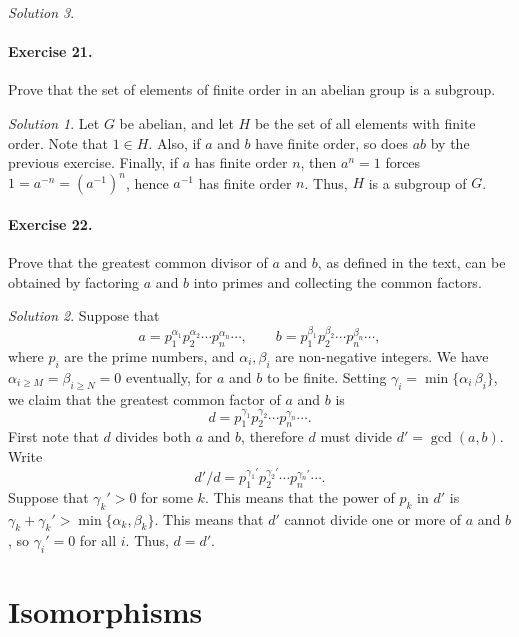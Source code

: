 \documentclass[11pt]{report}
\theoremstyle{remark}
\newtheorem*{solution}{Solution}
\begin{document}
\begin{solution}
    \paragraph{Exercise 21.} Prove that the set of elements of finite order in an
    abelian group is a subgroup.
    \begin{solution}
        Let $G$ be abelian, and let $H$ be the set of all elements with finite
        order. Note that $1 \in H$. Also, if $a$ and $b$ have finite order, so does
        $ab$ by the previous exercise. Finally, if $a$ has finite order $n$, then
        $a^n = 1$ forces $1 = a^{-n} = (a^{-1})^n$, hence $a^{-1}$ has finite order
        $n$. Thus, $H$ is a subgroup of $G$.
    \end{solution}

    \paragraph{Exercise 22.} Prove that the greatest common divisor of $a$ and $b$,
    as defined in the text, can be obtained by factoring $a$ and $b$ into primes and
    collecting the common factors.
    \begin{solution}
        Suppose that \[
            a = p_1^{\alpha_1}p_2^{\alpha_2} \cdots p_n^{\alpha_n} \cdots, \qquad
            b = p_1^{\beta_1}p_2^{\beta_2} \cdots p_n^{\beta_n} \cdots,
        \] where $p_i$ are the prime numbers, and $\alpha_i, \beta_i$ are
        non-negative integers.  We have $\alpha_{i \geq M} = \beta_{i \geq N} = 0$
        eventually, for $a$ and $b$ to be finite. Setting $\gamma_i =
        \min\{\alpha_i\, \beta_i\}$, we claim that the greatest common factor of $a$
        and $b$ is \[
            d = p_1^{\gamma_1}p_2^{\gamma_2} \cdots p_n^{\gamma_n} \cdots.
        \] First note that $d$ divides both $a$ and $b$, therefore $d$ must divide
        $d' = \gcd(a, b)$. Write \[
            d' / d = p_1^{\gamma_1'}p_2^{\gamma_2'}\cdots p_n^{\gamma_n'}\cdots.
        \] Suppose that $\gamma_k' > 0$ for some $k$. This means that the power of
        $p_k$ in $d'$ is $\gamma_k + \gamma_k' > \min\{\alpha_k, \beta_k\}$. This
        means that $d'$ cannot divide one or more of $a$ and $b$, so $\gamma_i' = 0$
        for all $i$. Thus, $d = d'$.
    \end{solution}

    

    \section{Isomorphisms}


\end{solution}
\end{document}

